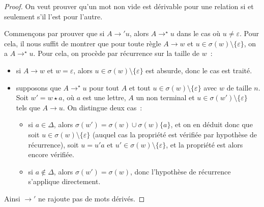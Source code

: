 \begin{proof}
  On veut prouver qu'un mot non vide est dérivable pour une relation si et
  seulement s'il l'est pour l'autre.

  Commençons par prouver que si $A \to' u$, alors $A \to^\star u$ dans le cas
  où $u \neq \varepsilon$. Pour cela, il nous suffit de montrer que pour toute
  règle $A \to w$ et $u \in \sigma(w)\setminus \{\varepsilon\}$, on a
  $A \to^\star u$. Pour cela, on procède par récurrence sur la taille de $w$~:
  \begin{itemize}
  \item si $A \to w$ et $w = \varepsilon$, alors
    $u \in \sigma(w) \setminus\{\varepsilon\}$ est absurde, donc le cas est
    traité.
  \item supposons que $A \to^\star u$ pour tout $A$ et tout
    $u \in \sigma(w)\setminus\{\varepsilon\}$ avec $w$ de taille $n$. Soit
    $w' = w\star a$, où $a$ est une lettre, $A$ un non terminal et
    $u \in \sigma(w')\setminus\{\varepsilon\}$ tels que $A \to u$. On distingue
    deux cas~:
    \begin{itemize}
    \item si $a \in \Delta$, alors $\sigma(w') = \sigma(w) \cup\sigma(w)\{a\}$,
      et on en déduit donc que soit $u \in \sigma(w)\setminus\{\varepsilon\}$
      (auquel cas la propriété est vérifiée par hypothèse de récurrence), soit
      $u = u'a$ et $u' \in \sigma(w) \setminus\{\varepsilon\}$, et la propriété
      est alors encore vérifiée.
    \item si $a \notin \Delta$, alors $\sigma(w')=\sigma(w)$, donc l'hypothèse
      de récurrence s'applique directement.
    \end{itemize}
  \end{itemize}
  Ainsi $\to'$ ne rajoute pas de mots dérivés.


\end{proof}
